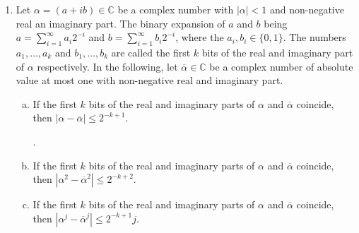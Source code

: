 \documentclass[12pt,a4paper]{article}
\newcommand{\br}[1]{\overline{#1}}
\begin{document}
\begin{enumerate}
\item Let $α = (a + ib)∈ℂ$ be a complex number with $|α|<1$ and non-negative real an imaginary part. The binary expansion of $a$ and $b$ being $a = ∑_{i=1}^∞ a_i 2^{-i}$ and  $b = ∑_{i=1}^∞ b_i 2^{-i}$, where the $a_i, b_i ∈ \{0,1\}$. The numbers $a_1,\dots,a_k$ and $b_1,\dots,b_k$ are called the first $k$ bits of the real and imaginary part of $α$ respectively. In the following, let $\br{α} ∈ℂ$ be a complex number of absolute value at most one with non-negative real and imaginary part.  
  \begin{enumerate}[a)]
  \item If the first $k$ bits of the real and imaginary parts of $α$ and $\br{α}$ coincide, then $|α - \br{α}| ≤2^{-k+1}$.

     . 
    
   \item If the first $k$ bits of the real and imaginary parts of $α$ and $\br{α}$ coincide, then $|α^2 - \br{α}^2| ≤2^{-k+2}$.

   \item If the first $k$ bits of the real and imaginary parts of $α$ and $\br{α}$ coincide, then $|α^j - \br{α}^j| ≤2^{-k+1} j$.

  \end{enumerate}


\end{enumerate}
\end{document}
